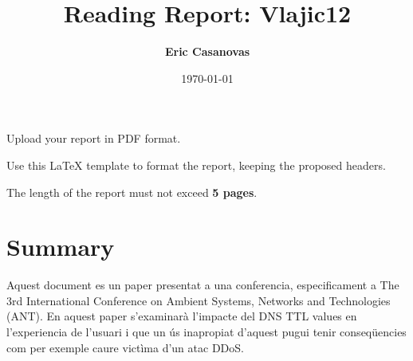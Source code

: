 \documentclass[a4paper, 10pt]{article}
\title{Reading Report: Vlajic12}
\author{\textbf{Eric Casanovas}}
\date{\normalsize\today{}}
\begin{document}
\maketitle

\begin{center}
  Upload your report in PDF format.
  
  Use this LaTeX template to format the report, keeping the proposed headers.
  
	The length of the report must not exceed \textbf{5 pages}.
\end{center}

\section{Summary}

Aquest document es un paper presentat a una conferencia, especificament a The 3rd International Conference on Ambient Systems, Networks and Technologies (ANT).
\newline \newline
En aquest paper s'examinarà l'impacte del DNS TTL values en l'experiencia de l'usuari i que un ús inapropiat d'aquest pugui tenir conseqüencies com per exemple caure victìma d'un atac DDoS.
\end{document}
